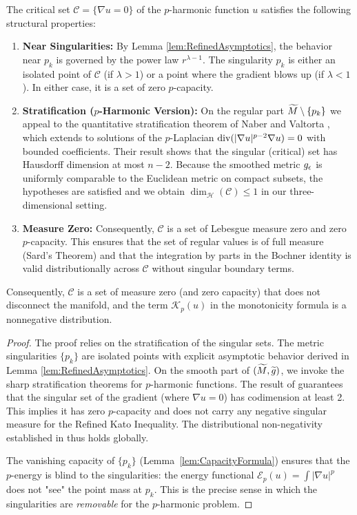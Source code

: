 \begin{proposition}\label{prop:CriticalSet}
The critical set $\mathcal{C} = \{ \nabla u = 0 \}$ of the $p$-harmonic function $u$ satisfies the following structural properties:
\begin{enumerate}
    \item \textbf{Near Singularities:} By Lemma \ref{lem:RefinedAsymptotics}, the behavior near $p_k$ is governed by the power law $r^{\lambda-1}$. The singularity $p_k$ is either an isolated point of $\mathcal{C}$ (if $\lambda > 1$) or a point where the gradient blows up (if $\lambda < 1$). In either case, it is a set of zero $p$-capacity.
    \item \textbf{Stratification ($p$-Harmonic Version):} On the regular part $\widetilde{M} \setminus \{p_k\}$ we appeal to the quantitative stratification theorem of Naber and Valtorta \cite{nabervaltorta2017}, which extends to solutions of the $p$-Laplacian $\mathrm{div}(|\nabla u|^{p-2}\nabla u)=0$ with bounded coefficients. Their result shows that the singular (critical) set has Hausdorff dimension at most $n-2$. Because the smoothed metric $g_{\epsilon}$ is uniformly comparable to the Euclidean metric on compact subsets, the hypotheses are satisfied and we obtain $\dim_{\mathcal{H}}(\mathcal{C}) \le 1$ in our three-dimensional setting.
    \item \textbf{Measure Zero:} Consequently, $\mathcal{C}$ is a set of Lebesgue measure zero and zero $p$-capacity. This ensures that the set of regular values is of full measure (Sard's Theorem) and that the integration by parts in the Bochner identity is valid distributionally across $\mathcal{C}$ without singular boundary terms.
\end{enumerate}
Consequently, $\mathcal{C}$ is a set of measure zero (and zero capacity) that does not disconnect the manifold, and the term $\mathcal{K}_p(u)$ in the monotonicity formula is a nonnegative distribution.
\end{proposition}
\begin{proof}
The proof relies on the stratification of the singular sets. The metric singularities $\{p_k\}$ are isolated points with explicit asymptotic behavior derived in Lemma \ref{lem:RefinedAsymptotics}. On the smooth part of $(\widetilde{M}, \widetilde{g})$, we invoke the sharp stratification theorems for $p$-harmonic functions. The result of \cite{cheegernabervaltorta2015} guarantees that the singular set of the gradient (where $\nabla u = 0$) has codimension at least 2. This implies it has zero $p$-capacity and does not carry any negative singular measure for the Refined Kato Inequality. The distributional non-negativity established in  thus holds globally.

The vanishing capacity of $\{p_k\}$ (Lemma~\ref{lem:CapacityFormula}) ensures that the $p$-energy is blind to the singularities: the energy functional $\mathcal{E}_p(u) = \int |\nabla u|^p$ does not "see" the point mass at $p_k$. This is the precise sense in which the singularities are \emph{removable} for the $p$-harmonic problem.
\end{proof}

